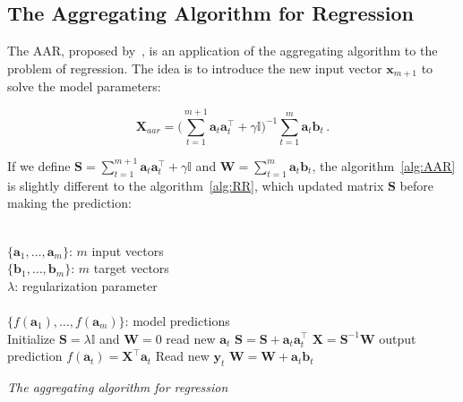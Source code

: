 \subsection{The Aggregating Algorithm for Regression}

The AAR, proposed by~\cite{vovk2001}, is an application of the aggregating
algorithm to the problem of regression. The idea is to introduce the new input
vector $\mathbf{x}_{m+1}$ to solve the model parameters: 

\begin{equation}
\label{eq:AARexpand}
\mathbf{X}_{aar} = \displaystyle \big (\sum_{t=1}^{m+1}
\mathbf{a}_t \mathbf{a}_t  ^\intercal + \gamma \mathbb{I}\big )^{-1}
\sum_{t=1}^m \mathbf{a}_t \mathbf{b}_t \, .
\end{equation}

If we define $\displaystyle\mathbf{S}= \sum_{t=1}^{m+1} \mathbf{a}_t
\mathbf{a}_t  ^\intercal + \gamma \mathbb{I} $ and $\mathbf{W}=
\displaystyle\sum_{t=1}^m \mathbf{a}_t \mathbf{b}_t$, the
algorithm~\ref{alg:AAR} is slightly different to the algorithm~\ref{alg:RR}, 
which updated matrix $\mathbf{S}$ before making the prediction:

\begin{algorithm}[ht]
\begin{algorithmic}[1]
\REQUIRE $\,$ \\
$\{\mathbf{a}_1,\dots,\mathbf{a}_{m} \}$: $m$ input vectors \\
$\{\mathbf{b}_1,\dots,\mathbf{b}_{m} \}$: $m$ target vectors \\
$\lambda$: regularization parameter \\
\ENSURE  $\,$ \\
$\{f(\mathbf{a}_1),\dots,f(\mathbf{a}_{m}) \}$: model predictions \\
\STATE Initialize $\mathbf{S}=\lambda \mathbb{I}$
and $\mathbf{W}=0$
	\STATE read new $\mathbf{a}_t$
   	\STATE $\mathbf{S} = \mathbf{S} + \mathbf{a}_t \mathbf{a}_t^\intercal$
	\STATE $\mathbf{X}=\mathbf{S}^{-1}\mathbf{W}$
	\STATE output prediction $f(\mathbf{a}_t) = \mathbf{X}^\intercal \mathbf{a}_t$
   	\STATE Read new $\mathbf{y}_t$
    	\STATE $\mathbf{W} = \mathbf{W} + \mathbf{a}_t \mathbf{b}_t$
\ENDFOR
\end{algorithmic}
\caption{{\em The aggregating algorithm for regression}}
\label{alg:AAR}
\end{algorithm}






